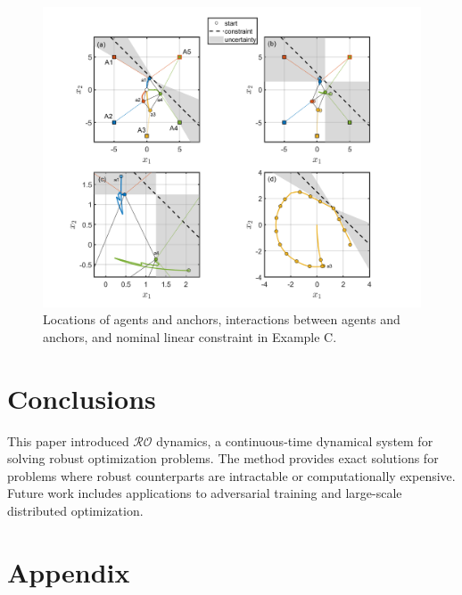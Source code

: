 \documentclass[journal,twoside,web]{ieeecolor}
\newcommand{\rev}[1]{\textcolor{revisionblue}{#1}}
\begin{document}
\begin{figure}
\begin{center}
\includegraphics[scale=0.26]{simulation_figure_finalv3.png}
\vspace{-1.5mm}
\caption{\rev{Locations of agents and anchors, interactions between agents and anchors, and nominal linear constraint in Example C.}}
\label{fig_points}
\end{center}
\end{figure}

\section{Conclusions}\label{section_conclusions}


This paper introduced $\mathcal{RO}$ dynamics, a continuous-time dynamical system for solving robust optimization problems. The method provides exact solutions for problems where robust counterparts are intractable or computationally expensive. Future work includes applications to adversarial training and large-scale distributed optimization.
\section{Appendix} \label{section_appendix}
\end{document}
